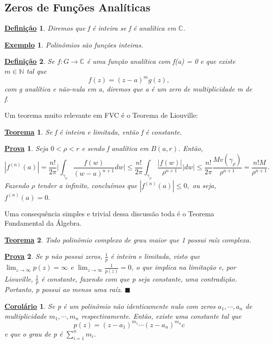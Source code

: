 \documentclass{article}
\newtheorem*{def*}{\underline{Defini\c c\~ao}}
\newtheorem*{theorem*}{\underline{Teorema}}
\newtheorem{example}{\underline{Exemplo}}[section]
\newtheorem*{proof*}{\underline{Prova}}
\newtheorem*{crl*}{\underline{Corol\'ario}}
\renewcommand\qedsymbol{$\blacksquare$}
\begin{document}
\subsection{Zeros de Fun\c c\~oes Anal\'iticas}
\begin{def*}
  Diremos que f \'e inteira se f \'e anal\'itica em $\mathbb{C}$.
\end{def*}
\begin{example}
  Polin\^omios s\~ao fun\c c\~oes inteiras.
\end{example}
\begin{def*}
  Se $f:G\rightarrow \mathbb{C}$ \'e uma fun\c c\~ao anal\'itica com f(a) = 0 e que existe $m\in \mathbb{N}$ tal que 
  $$
    f(z) = (z-a)^{m}g(z),
  $$
  com g anal\'itica e n\~ao-nula em a, diremos que a \'e um zero de multiplicidade m de f.
\end{def*}
  Um teorema muito relevante em FVC \'e o Teorema de Liouville:
 \begin{theorem*}
   Se f \'e inteira e limitada, ent\~ao f \'e constante.
 \end{theorem*}
\begin{proof*}
  Seja $0 < \rho < r$ e sendo f anal\'itica em $B(a, r)$. Ent\~ao, 
  $$
    |f^{(n)}(a)| = \frac{n!}{2 \pi}\biggl|\int_{\gamma_{\rho}}^{}\frac{f(w)}{(w-a)^{n+1}}dw\biggr|
\leq \frac{n!}{2\pi}\int_{\gamma_{\rho}}^{}\frac{|f(w)|}{\rho^{n+1}}|dw| \leq \frac{n!}{2\pi}\frac{Mv(\gamma_{\rho})}{\rho^{n+1}} = \frac{n!M}{\rho^{n+1}}.
  $$
  Fazendo $\rho$ tender a infinito, conclu\'imos que $|f^{(n)}(a)|\leq0,$ ou seja, $f^{(n)}(a) = 0.$
\end{proof*}
  Uma consequ\^encia simples e trivial dessa discuss\~ao toda \'e o Teorema Fundamental da \'Algebra.
\begin{theorem*}
  Todo polin\^omio complexo de grau maior que 1 possui ra\'iz complexa. 
\end{theorem*}
\begin{proof*}
  Se p n\~ao possui zeros, $\frac{1}{p}$ \'e inteira e limitada, visto que $\lim_{z\to\infty}p(z) = \infty$ e $\lim_{z\to\infty}\frac{1}{p(z)} = 0$, 
o que implica na limita\c c\~ao e, por Liouville, $\frac{1}{p}$ \'e constante, fazendo com que p seja constante, uma contradi\c c\~ao.
Portanto, p possui ao menos uma ra\'iz. \qedsymbol
\end{proof*}
\begin{crl*}
  Se p \'e um polin\^omio n\~ao identicamente nulo com zeros $a_1, \cdots, a_{n}$ de multiplicidade $m_1, \cdots, m_{n}$ respectivamente. Ent\~ao,
existe uma constante tal que 
  $$
    p(z) = (z-a_1)^{m_1}\cdots(z-a_{n})^{m_{n}}c
  $$
  e que o grau de p \'e $\sum\limits_{i=1}^{n}m_{i}$.
\end{crl*}
\newpage
\end{document}

